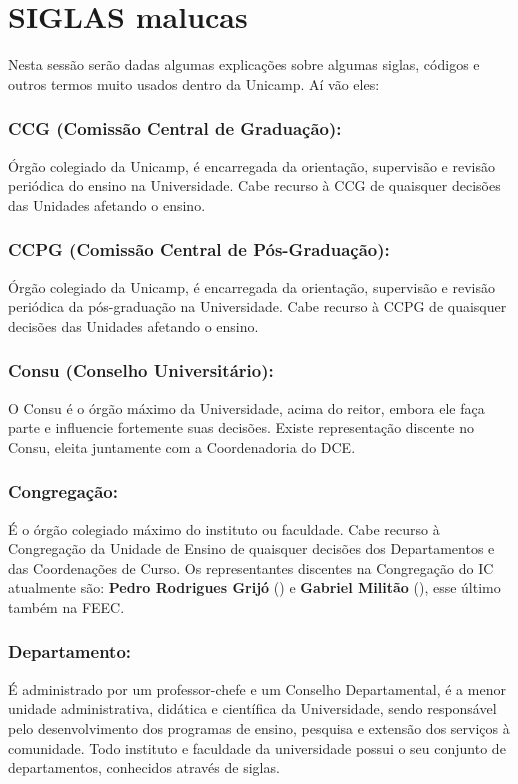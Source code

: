 
\section{SIGLAS malucas}

Nesta sessão serão dadas algumas explicações sobre algumas siglas, códigos e
outros termos muito usados dentro da Unicamp. Aí vão eles:

\subsubsection{CCG (Comissão Central de Graduação):} Órgão colegiado da Unicamp,
é encarregada da orientação, supervisão e revisão periódica do ensino na
Universidade. Cabe recurso à CCG de quaisquer decisões das Unidades afetando o
ensino.

\subsubsection{CCPG (Comissão Central de Pós-Graduação):} Órgão colegiado da
Unicamp, é encarregada da orientação, supervisão e revisão periódica da
pós-graduação na Universidade. Cabe recurso à CCPG de quaisquer decisões das
Unidades afetando o ensino.

\subsubsection{Consu (Conselho Universitário):} O Consu é o órgão máximo da
Universidade, acima do reitor, embora ele faça parte e influencie fortemente
suas decisões.  Existe representação discente no Consu, eleita juntamente com a
Coordenadoria do DCE.

\subsubsection{Congregação:} É o órgão colegiado máximo do instituto ou
faculdade.  Cabe recurso à Congregação da Unidade de Ensino de quaisquer
decisões dos Departamentos e das Coordenações de Curso. Os representantes
discentes na Congregação do IC atualmente são: \textbf{Pedro Rodrigues Grijó}
() e \textbf{Gabriel Militão}
(), esse último também na FEEC.

\subsubsection{Departamento:} É administrado por um professor-chefe e um
Conselho Departamental, é a menor unidade administrativa, didática e científica
da Universidade, sendo responsável pelo desenvolvimento dos programas de ensino,
pesquisa e extensão dos serviços à comunidade. Todo instituto e faculdade da
universidade possui o seu conjunto de departamentos, conhecidos através de
siglas.

